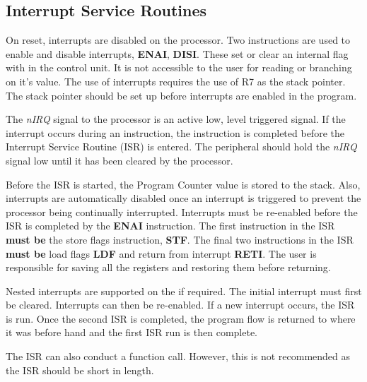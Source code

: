 \subsection{Interrupt Service Routines}

On reset, interrupts are disabled on the \samurai{} processor.
Two instructions are used to enable and disable interrupts, \textbf{ENAI}, \textbf{DISI}.
These set or clear an internal flag with in the control unit. 
It is not accessible to the user for reading or branching on it's value.
The use of interrupts requires the use of R7 as the stack pointer. 
The stack pointer should be set up before interrupts are enabled in the program.

The \textit{nIRQ} signal to the \samurai{} processor is an active low, level triggered signal.
If the interrupt occurs during an instruction, the instruction is completed before the Interrupt Service Routine (ISR) is entered.
The peripheral should hold the \textit{nIRQ} signal low until it has been cleared by the processor.

Before the ISR is started, the Program Counter value is stored to the stack. 
Also, interrupts are automatically disabled once an interrupt is triggered to prevent the processor being continually interrupted.
Interrupts must be re-enabled before the ISR is completed by the \textbf{ENAI} instruction.
The first instruction in the ISR \textbf{must be} the store flags instruction, \textbf{STF}. 
The final two instructions in the ISR \textbf{must be} load flags \textbf{LDF} and return from interrupt \textbf{RETI}. 
The user is responsible for saving all the registers and restoring them before returning. 

Nested interrupts are supported on the \samurai{} if required. 
The initial interrupt must first be cleared. 
Interrupts can then be re-enabled. 
If a new interrupt occurs, the ISR is run. 
Once the second ISR is completed, the program flow is returned to where it was before hand and the first ISR run is then complete.

The ISR can also conduct a function call. 
However, this is not recommended as the ISR should be short in length.

